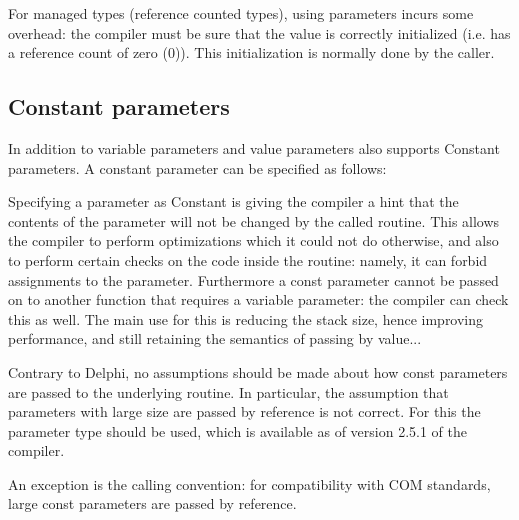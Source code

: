 \begin{remark}
For managed types (reference counted types), using  parameters incurs some overhead: 
the compiler must be sure that the value is correctly initialized (i.e. has a reference count 
of zero (0)). This initialization is normally done by the caller.
\end{remark}



%
\subsection{Constant parameters}
In addition to variable parameters and value parameters \fpc also supports
Constant parameters. A constant parameter can be specified as follows:

Specifying a parameter as Constant is giving the compiler a hint that the
contents of the parameter will not be changed by the called routine. This
allows the compiler to perform optimizations which it could not do otherwise, 
and also to perform certain checks on the code inside the routine: namely,
it can forbid assignments to the parameter. 
Furthermore a const parameter cannot be passed on to another
function that requires a variable parameter: the compiler can check this as
well.
The main use for this is reducing the stack size, hence improving
performance, and still retaining the semantics of passing by value...

\begin{remark}
Contrary to Delphi, no assumptions should be made about how const parameters
are passed to the underlying routine. In particular, the assumption that
parameters with large size are passed by reference is not correct. For this
the  parameter type should be used, which is available as of
version 2.5.1 of the compiler.

An exception is the  calling convention: for compatibility with
COM standards, large const parameters are passed by reference.
\end{remark}

